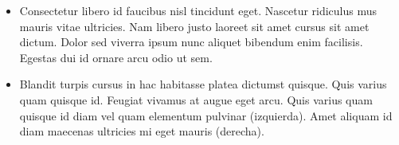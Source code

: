 \begin{PosterColumn}{0.23}

\begin{TextBox}
 \vspace*{0.9cm}
 
 \sf \LARGE

\begin{itemize}
\item Consectetur libero id faucibus nisl tincidunt eget. Nascetur ridiculus mus mauris vitae ultricies. Nam libero justo laoreet sit amet cursus sit amet dictum. Dolor sed viverra ipsum nunc aliquet bibendum enim facilisis. Egestas dui id ornare arcu odio ut sem. 
\begin{center}
\end{center}
\item Blandit turpis cursus in hac habitasse platea dictumst quisque. Quis varius quam quisque id. Feugiat vivamus at augue eget arcu. 
Quis varius quam quisque id diam vel quam elementum pulvinar (izquierda). 
Amet aliquam id diam maecenas ultricies mi eget mauris (derecha).
\begin{center}
\end{center}
\end{itemize}



 
\end{TextBox}



\end{PosterColumn}
